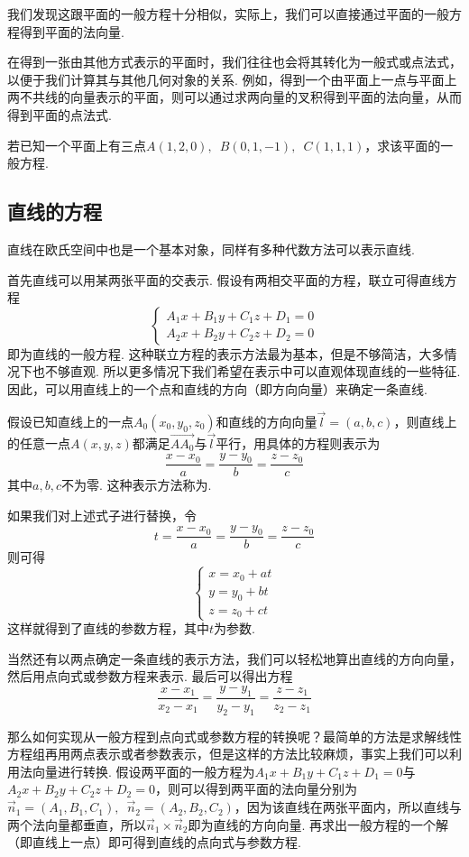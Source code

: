 我们发现这跟平面的一般方程十分相似，实际上，我们可以直接通过平面的一般方程得到平面的法向量.

在得到一张由其他方式表示的平面时，我们往往也会将其转化为一般式或点法式，以便于我们计算其与其他几何对象的关系. 例如，得到一个由平面上一点与平面上两不共线的向量表示的平面，则可以通过求两向量的叉积得到平面的法向量，从而得到平面的点法式.

\begin{example}{}{}
    若已知一个平面上有三点$A(1,2,0),\enspace B(0,1,-1),\enspace C(1,1,1)$，求该平面的一般方程.
\end{example}

\subsection{直线的方程}

直线在欧氏空间中也是一个基本对象，同样有多种代数方法可以表示直线.

首先直线可以用某两张平面的交表示. 假设有两相交平面的方程，联立可得直线方程
\[\begin{cases}
        A_1x+B_1y+C_1z+D_1=0 \\
        A_2x+B_2y+C_2z+D_2=0
    \end{cases}\]
即为直线的一般方程. 这种联立方程的表示方法最为基本，但是不够简洁，大多情况下也不够直观. 所以更多情况下我们希望在表示中可以直观体现直线的一些特征. 因此，可以用直线上的一个点和直线的方向（即方向向量）来确定一条直线.

假设已知直线上的一点$A_0(x_0,y_0,z_0)$和直线的方向向量$\vec{l}=(a,b,c)$，则直线上的任意一点$A(x,y,z)$都满足$\overrightarrow{AA_0}$与$\vec{l}$平行，用具体的方程则表示为
\[\frac{x-x_0}{a}=\frac{y-y_0}{b}=\frac{z-z_0}{c}\]
其中$a,b,c$不为零. 这种表示方法称为.

如果我们对上述式子进行替换，令\[t=\frac{x-x_0}{a}=\frac{y-y_0}{b}=\frac{z-z_0}{c}\]
则可得
\[\begin{cases}
        x=x_0+at \\
        y=y_0+bt \\
        z=z_0+ct
    \end{cases}\]
这样就得到了直线的参数方程，其中$t$为参数.

当然还有以两点确定一条直线的表示方法，我们可以轻松地算出直线的方向向量，然后用点向式或参数方程来表示. 最后可以得出方程
\[\frac{x-x_1}{x_2-x_1}=\frac{y-y_1}{y_2-y_1}=\frac{z-z_1}{z_2-z_1}\]

那么如何实现从一般方程到点向式或参数方程的转换呢？最简单的方法是求解线性方程组再用两点表示或者参数表示，但是这样的方法比较麻烦，事实上我们可以利用法向量进行转换. 假设两平面的一般方程为$A_1x+B_1y+C_1z+D_1=0$与$A_2x+B_2y+C_2z+D_2=0$，则可以得到两平面的法向量分别为$\vec{n}_1=(A_1,B_1,C_1),\enspace\vec{n}_2=(A_2,B_2,C_2)$，因为该直线在两张平面内，所以直线与两个法向量都垂直，所以$\vec{n}_1\times\vec{n}_2$即为直线的方向向量. 再求出一般方程的一个解（即直线上一点）即可得到直线的点向式与参数方程.


